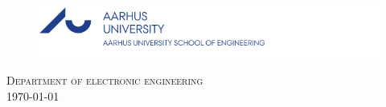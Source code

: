 \begin{center}
\vspace{5cm}


\begin{figure}[H]
\hfill
\includegraphics[width=.75\textwidth]{billeder/au-ingenioerhoejskolen_en}
\end{figure}

\vfill
\textsc{\large Department of electronic engineering}\\[0.5cm]

{\large \today}\\[3cm] %
\end{center}
 